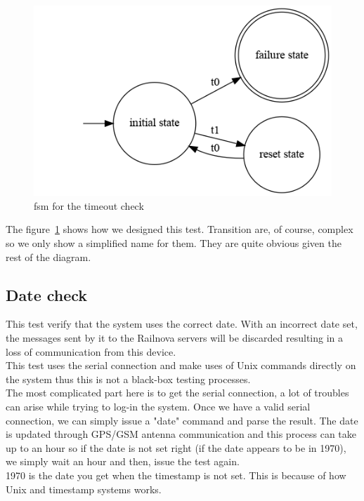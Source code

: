 \documentclass[12pt]{article}
\theoremstyle{definition}
\theoremstyle{definition}
\begin{document}
\begin{figure}
    \centering
    \includegraphics[scale=0.6]{graph/TimeoutCheck}
    \caption{\gls{fsm} for the timeout check}
    \label{timeoutcheck}
\end{figure}

The figure~\ref{timeoutcheck} shows how we designed this test. Transition are, of course, complex so we only show a simplified name for them. They are quite obvious given the rest of the diagram.

\subsection{Date check}

This test verify that the system uses the correct date. With an incorrect date set, the messages sent by it to the Railnova servers will be discarded resulting in a loss of communication from this device.\\

This test uses the serial connection and make uses of Unix commands directly on the system thus this is not a black-box testing processes.\\

The most complicated part here is to get the serial connection, a lot of troubles can arise while trying to log-in the system. Once we have a valid serial connection, we can simply issue a "date" command and parse the result. The date is updated through GPS/GSM antenna communication and this process can take up to an hour so if the date is not set right (if the date appears to be in 1970), we simply wait an hour and then, issue the test again.\\

1970 is the date you get when the timestamp is not set. This is because of how Unix and timestamp systems works.
\end{document}

